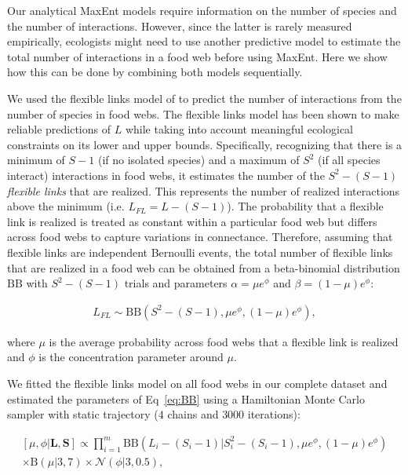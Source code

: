 \begin{box3.1}

Our analytical MaxEnt models require information on the number of species and
the number of interactions. However, since the latter is rarely measured
empirically, ecologists might need to use another predictive model to estimate
the total number of interactions in a food web before using MaxEnt. Here we show
how this can be done by combining both models sequentially.  

We used the flexible links model of \cite{MacDonald2020Revisiting} to predict the
number of interactions from the number of species in food webs. The flexible
links model has been shown to make reliable predictions of $L$ while taking into
account meaningful ecological constraints on its lower and upper bounds.
Specifically, recognizing that there is a minimum of $S-1$ (if no isolated
species) and a maximum of $S^2$ (if all species interact) interactions in food
webs, it estimates the number of the $S^2 - (S - 1)$ \textit{flexible links}
that are realized. This represents the number of realized interactions above the
minimum (i.e. $L_{FL} = L - (S - 1)$). The probability that a flexible link is
realized is treated as constant within a particular food web but differs across
food webs to capture variations in connectance. Therefore, assuming that
flexible links are independent Bernoulli events, the total number of flexible
links that are realized in a food web can be obtained from a beta-binomial
distribution $\mathrm{BB}$ with $S^2 - (S - 1)$ trials and parameters $\alpha =
\mu e^\phi$ and $\beta = (1 - \mu) e^\phi$:
  
\begin{eqnarray}
  \label{eq:BB}
         L_{FL} \sim \mathrm{BB}(S^2 - (S - 1), \mu e^\phi, (1 - \mu) e^\phi),
\end{eqnarray}
  
where $\mu$ is the average probability across food webs that a flexible link
is realized and $\phi$ is the concentration parameter around $\mu$.
  
We fitted the flexible links model on all food webs in our complete dataset
and estimated the parameters of Eq~\ref{eq:BB} using a Hamiltonian Monte
Carlo sampler with static trajectory ($4$ chains and $3000$ iterations):

\begin{eqnarray*}
  \label{eq:BBpost}
      [\mu, \phi| \textbf{L}, \textbf{S}] \propto \prod_{i = 1}^{m}
      \mathrm{BB}(L_i - (S_i - 1) | S_i^2 - (S_i - 1), \mu e^{\phi}, (1 - \mu)
      e^\phi) \\ \times \mathrm{B}(\mu| 3 , 7 ) \times \mathcal{N}(\phi | 3, 0.5), 
\end{eqnarray*}
  

\end{box3.1}

